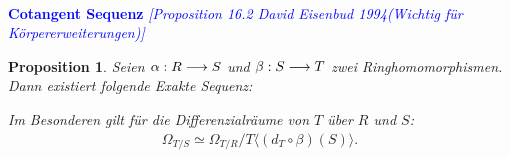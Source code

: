 \documentclass[10pt,a4paper]{report}
\newcommand{\ModulsOfDifferenzials}{David Eisenbud 1994}
\newcounter{Aussage}[chapter]
\newtheorem{prop}[Aussage]{Proposition}
\newcommand{\functionfront}[3]{\nolinebreak{#1:#2 \longrightarrow #3}}
\newcommand{\divR}[2]{\Omega_{#1/#2}}
\newcommand{\divf}[1]{d_{#1}}
\newcommand{\Tensor}[3]{#1 \otimes_{#2} #3}
\newcommand{\tensor}[3]{#1 \otimes #3}
\begin{document}
\ \\
\textcolor{blue}{\textbf{Cotangent Sequenz} \textit{[Proposition 16.2 \ModulsOfDifferenzials (Wichtig für Körpererweiterungen)]}}
\begin{prop}\label{Cotangent Sequenz}
Seien $\functionfront{\alpha}{R}{S}$ und $\functionfront{\beta}{S}{T}$ zwei Ringhomomorphismen. Dann existiert folgende Exakte Sequenz:
\begin{center}
\end{center}
Im Besonderen gilt für die Differenzialräume von $T$ über $R$ und $S$:
\begin{gather*}
\divR{T}{S} \simeq \divR{T}{R}/T \langle (\divf{T} \circ \beta)(S)\rangle.
\end{gather*}
\end{prop}
\end{document}
